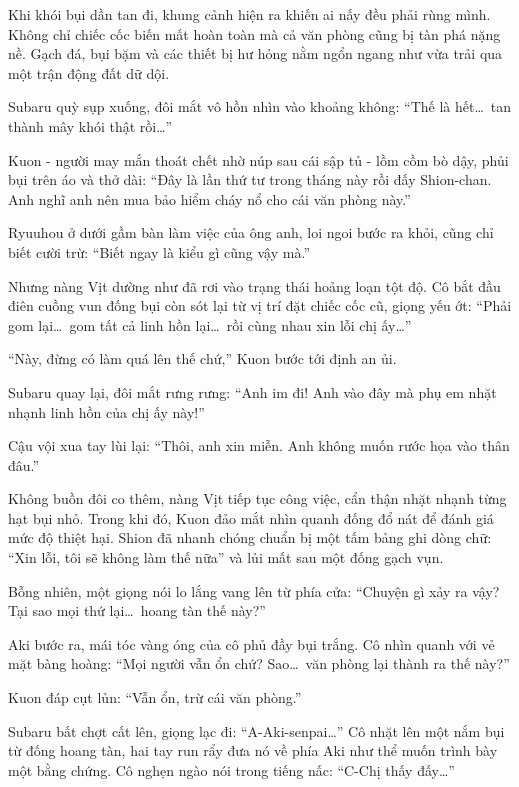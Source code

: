 \documentclass[../main.tex]{subfiles}
\begin{document}
Khi khói bụi dần tan đi, khung cảnh hiện ra khiến ai nấy đều phải rùng mình. Không chỉ chiếc cốc biến mất hoàn toàn mà cả văn phòng cũng bị tàn phá nặng nề. Gạch đá, bụi bặm và các thiết bị hư hỏng nằm ngổn ngang như vừa trải qua một trận động đất dữ dội.


Subaru quỳ sụp xuống, đôi mắt vô hồn nhìn vào khoảng không: ``Thế là hết\dots\ tan thành mây khói thật rồi\dots''

Kuon - người may mắn thoát chết nhờ núp sau cái sập tủ - lồm cồm bò dậy, phủi bụi trên áo và thở dài: ``Đây là lần thứ tư trong tháng này rồi đấy Shion-chan. Anh nghĩ anh nên mua bảo hiểm cháy nổ cho cái văn phòng này.''

Ryuuhou ở dưới gầm bàn làm việc của ông anh, loi ngoi bước ra khỏi, cũng chỉ biết cười trừ: ``Biết ngay là kiểu gì cũng vậy mà.''

Nhưng nàng Vịt dường như đã rơi vào trạng thái hoảng loạn tột độ. Cô bắt đầu điên cuồng vun đống bụi còn sót lại từ vị trí đặt chiếc cốc cũ, giọng yếu ớt: ``Phải gom lại\dots\ gom tất cả linh hồn lại\dots\ rồi cùng nhau xin lỗi chị ấy\dots''


``Này, đừng có làm quá lên thế chứ,'' Kuon bước tới định an ủi.

Subaru quay lại, đôi mắt rưng rưng: ``Anh im đi! Anh vào đây mà phụ em nhặt nhạnh linh hồn của chị ấy này!''

Cậu vội xua tay lùi lại: ``Thôi, anh xin miễn. Anh không muốn rước họa vào thân đâu.''

Không buồn đôi co thêm, nàng Vịt tiếp tục công việc, cẩn thận nhặt nhạnh từng hạt bụi nhỏ. Trong khi đó, Kuon đảo mắt nhìn quanh đống đổ nát để đánh giá mức độ thiệt hại. Shion đã nhanh chóng chuẩn bị một tấm bảng ghi dòng chữ: ``Xin lỗi, tôi sẽ không làm thế nữa'' và lủi mất sau một đống gạch vụn.

Bỗng nhiên, một giọng nói lo lắng vang lên từ phía cửa: ``Chuyện gì xảy ra vậy? Tại sao mọi thứ lại\dots\ hoang tàn thế này?''

Aki bước ra, mái tóc vàng óng của cô phủ đầy bụi trắng. Cô nhìn quanh với vẻ mặt bàng hoàng: ``Mọi người vẫn ổn chứ? Sao\dots\ văn phòng lại thành ra thế này?''

Kuon đáp cụt lủn: ``Vẫn ổn, trừ cái văn phòng.''

Subaru bất chợt cất lên, giọng lạc đi: ``A-Aki-senpai\dots'' Cô nhặt lên một nắm bụi từ đống hoang tàn, hai tay run rẩy đưa nó về phía Aki như thể muốn trình bày một bằng chứng. Cô nghẹn ngào nói trong tiếng nấc: ``C-Chị thấy đấy\dots''
\end{document}
